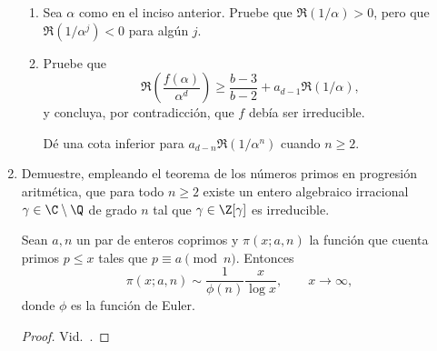 \documentclass[11pt, reqno]{amsart}
\begin{document}
\begin{enumerate}
\begin{enumerate}
			\item Sea $\alpha$ como en el inciso anterior.
				Pruebe que $\Re(1/\alpha) > 0$, pero que $\Re(1/\alpha^j) < 0$ para algún $j$. 

			\item Pruebe que
				\[
					\Re\mathopen{}\left( \frac{f(\alpha)}{\alpha^d} \right) \ge \frac{b-3}{b-2} + a_{d-1} \Re(1/\alpha),
				\]
				y concluya, por contradicción, que $f$ debía ser irreducible.

				\begin{hint}
					Dé una cota inferior para $a_{d-n} \Re(1/\alpha^n)$ cuando $n \ge 2$.
				\end{hint}

		\end{enumerate}
		\nocite{granville:masterclass}

		\newex
	\item
		Demuestre, empleando el teorema de los números primos en progresión aritmética, que para todo $n \ge 2$ existe un entero
		algebraico irracional $\gamma \in \C \setminus \Q$ de grado $n$ tal que $\gamma \in \Z[\gamma]$ es irreducible.

		\begin{thm}
			Sean $a, n$ un par de enteros coprimos y $\pi(x; a, n)$ la función que cuenta primos $p \le x$ tales que $p \equiv a
			\pmod n$.
			Entonces
			\[
				\pi(x; a, n) \sim \frac{1}{\phi(n)} \frac{x}{\log x}, \qquad x \to \infty,
			\]
			donde $\phi$ es la función de Euler.
		\end{thm}
		\begin{proof}
			Vid.\ \cite[361]{tenenbaum:analytique}.
		\end{proof}
\end{enumerate}

\begin{additional}
\newpage
\printbibliography[title={Referencias y lecturas adicionales}]
\end{additional}
\end{document}
